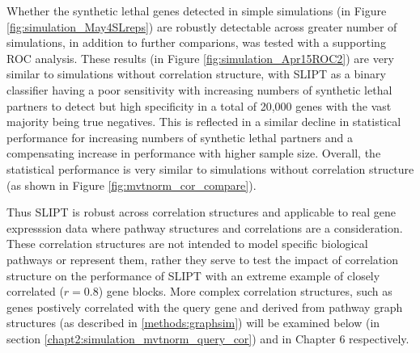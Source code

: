 Whether the synthetic lethal genes detected in simple simulations (in Figure \ref{fig:simulation_May4SLreps}) are robustly detectable across greater number of simulations, in addition to further comparions, was tested with a supporting ROC analysis. These results (in Figure \ref{fig:simulation_Apr15ROC2}) are very similar to simulations without correlation structure, with SLIPT as a binary classifier having a poor sensitivity with increasing numbers of synthetic lethal partners to detect but high specificity in a total of 20,000 genes with the vast majority being true negatives. This is reflected in a similar decline in statistical performance for increasing numbers of synthetic lethal partners and a compensating increase in performance with higher sample size. Overall, the statistical performance is very similar to simulations without correlation structure (as shown in Figure \ref{fig:mvtnorm_cor_compare}).

Thus SLIPT is robust across correlation structures and applicable to real gene expresssion data where pathway structures and correlations are a consideration. These correlation structures are not intended to model specific biological pathways or represent them, rather they serve to test the impact of correlation structure on the performance of SLIPT with an extreme example of closely correlated ($r = 0.8$) gene blocks. More complex correlation structures, such as genes postively correlated with the query gene and derived from pathway graph structures (as described in \ref{methods:graphsim}) will be examined below (in section \ref{chapt2:simulation_mvtnorm_query_cor}) and in Chapter 6 respectively.

